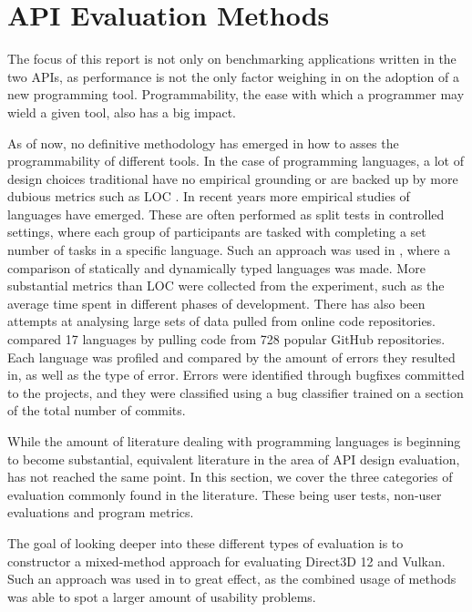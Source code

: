 \section{\gls{API} Evaluation Methods}\label{sec:apimethods}
The focus of this report is not only on benchmarking applications written in the two \glspl{API}, as performance is not the only factor weighing in on the adoption of a new programming tool.
Programmability, the ease with which a programmer may wield a given tool, also has a big impact.

As of now, no definitive methodology has emerged in how to asses the programmability of different tools.
In the case of programming languages, a lot of design choices traditional have no empirical grounding or are backed up by more dubious metrics such as \gls{LOC} \cite{markstrum2010staking}.
In recent years more empirical studies of languages have emerged.
These are often performed as split tests in controlled settings, where each group of participants are tasked with completing a set number of tasks in a specific language.
Such an approach was used in \citet{hanenberg2010experiment}, where a comparison of statically and dynamically typed languages was made. 
More substantial metrics than \gls{LOC} were collected from the experiment, such as the average time spent in different phases of development.
There has also been attempts at analysing large sets of data pulled from online code repositories.
\citet{ray2014large} compared 17 languages by pulling code from 728 popular GitHub repositories.
Each language was profiled and compared by the amount of errors they resulted in, as well as the type of error.
Errors were identified through bugfixes committed to the projects, and they were classified using a bug classifier trained on a section of the total number of commits.  

While the amount of literature dealing with programming languages is beginning to become substantial, equivalent literature in the area of \gls{API} design evaluation, has not reached the same point.
In this section, we cover the three categories of evaluation commonly found in the literature.
These being user tests, non-user evaluations and program metrics.     

The goal of looking deeper into these different types of evaluation is to constructor a mixed-method approach for evaluating Direct3D 12 and Vulkan.
Such an approach was used in \citet{grill2012methods, beaton2008usability} to great effect, as the combined usage of methods was able to spot a larger amount of usability problems.

